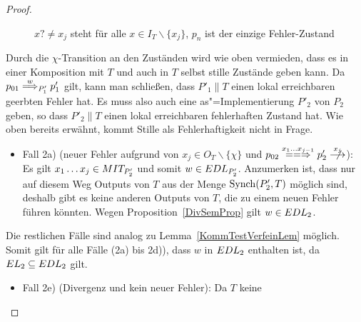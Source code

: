 \begin{proof}
\begin{itemize}
\begin{figure} [h!tbp]
\begin{center}
        \caption{$x?\neq x_j$ steht für alle $x\in I_T\backslash\{x_j\}$, $p_n$
          ist der einzige Fehler-Zustand}
      \label{TmitEundO}
      \end{center}
      \end{figure}
      Durch die $\chi$-Transition an den Zuständen wird wie oben vermieden,
      dass es in einer Komposition mit $T$ und auch in $T$ selbst
      stille Zustände geben kann. Da $p_{01} \weakmust[w]_{P'_1} p'_1$ gilt,
      kann man schließen, dass $P'_1\|T$ einen lokal erreichbaren geerbten
      Fehler hat. Es muss also auch eine as"=Implementierung $P'_2$ von $P_2$
      geben, so dass $P'_2\|T$ einen lokal erreichbaren fehlerhaften Zustand
      hat. Wie oben bereits erwähnt, kommt Stille als Fehlerhaftigkeit nicht in
      Frage.
      \begin{itemize}
        \item Fall 2a) \big(neuer Fehler aufgrund von $x_j\in O_T\backslash
          \{\chi\}$ und $p_{02} \lweakmay[x_1\dots x_{j-1}] p'_2
          \nmust[x_j]$\big): Es gilt $x_1\dots x_j\in MIT _{P'_2}$ und somit
          $w\in EDL _{P'_2}$. Anzumerken ist, dass nur auf diesem Weg Outputs
          von $T$ aus der Menge $\mathrm{Synch} (P'_2,T)$ möglich sind, deshalb gibt es
          keine anderen Outputs von $T$, die zu einem neuen Fehler führen
          könnten. Wegen Proposition~\ref{DivSemProp} gilt $w\in EDL _2$.
      \end{itemize}
      Die restlichen Fälle sind analog zu Lemma~\ref{KommTestVerfeinLem}
      möglich. Somit gilt für alle Fälle \big(2a) bis 2d)\big), dass $w$ in
      $EDL _2$ enthalten ist, da $EL _2\subseteq EDL _2$ gilt.
      \begin{itemize}
        \item Fall 2e) (Divergenz und kein neuer Fehler): Da $T$ keine

\end{itemize}
\end{itemize}
\end{proof}
